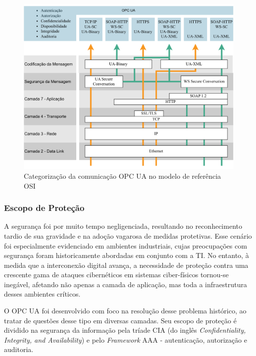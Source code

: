         \begin{figure}[htbp]
            \caption{Categorização da comunicação OPC UA no modelo de referência OSI}
            \label{fig:ua-osi}
            \begin{center}
                \includegraphics[width=0.9\linewidth]{USPSC-img/ua-osi.png}
            \end{center}
        \end{figure}

    \subsubsection{Escopo de Proteção}

        A segurança foi por muito tempo negligenciada, resultando no reconhecimento tardio de sua gravidade e na adoção vagarosa de medidas protetivas. Esse cenário foi especialmente evidenciado em ambientes industriais, cujas preocupações com segurança foram historicamente abordadas em conjunto com a TI. No entanto, à medida que a interconexão digital avança, a necessidade de proteção contra uma crescente gama de ataques cibernéticos em sistemas ciber-físicos tornou-se inegável, afetando não apenas a camada de aplicação, mas toda a infraestrutura desses ambientes críticos.

        O OPC UA foi desenvolvido com foco na resolução desse problema histórico, ao tratar de questões desse tipo em diversas camadas. Seu escopo de proteção é dividido na segurança da informação pela tríade CIA (do inglês \textit{Confidentiality, Integrity, and Availability}) e pelo \textit{Framework} AAA - autenticação, autorização e auditoria.
        
